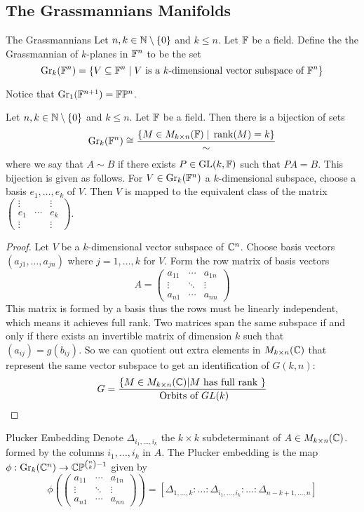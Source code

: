 \documentclass[a4paper]{article}
\begin{document}
\subsection{The Grassmannians Manifolds}
\begin{defn}{The Grassmannians}{} Let $n,k\in\mathbb{N}\setminus\{0\}$ and $k\leq n$. Let $\mathbb{F}$ be a field. Define the the Grassmannian of $k$-planes in $\mathbb{F}^n$ to be the set $$\operatorname{Gr}_k(\mathbb{F}^n)=\{V\subseteq\mathbb{F}^n\;|\;V\text{ is a }k\text{-dimensional vector subspace of }\mathbb{F}^n\}$$
\end{defn}

Notice that $\operatorname{Gr}_1(\mathbb{F}^{n+1})=\mathbb{F}\mathbb{P}^n$. 

\begin{lmm}{}{} Let $n,k\in\mathbb{N}\setminus\{0\}$ and $k\leq n$. Let $\mathbb{F}$ be a field. Then there is a bijection of sets $$\operatorname{Gr}_k(\mathbb{F}^n)\cong\frac{\{M\in M_{k\times n}(\mathbb{F})\;|\;\rank(M)=k\}}{\sim}$$ where we say that $A\sim B$ if there exists $P\in\operatorname{GL}(k,\mathbb{F})$ such that $PA=B$. This bijection is given as follows. For $V\in\operatorname{Gr}_k(\mathbb{F}^n)$ a $k$-dimensional subspace, choose a basis $e_1,\dots,e_k$ of $V$. Then $V$ is mapped to the equivalent class of the matrix $\begin{pmatrix}
\vdots &&\vdots\\
e_1 & \cdots & e_k\\
\vdots &&\vdots
\end{pmatrix}$. \tcbline
\begin{proof}
Let $V$ be a $k$-dimensional vector subspace of $\mathbb{C}^n$. Choose basis vectors $(a_{j1},\dots,a_{jn})$ where $j=1,\dots,k$ for $V$. Form the row matrix of basis vectors $$A=\begin{pmatrix}a_{11} & \cdots & a_{1n}\\\vdots & \ddots & \vdots\\ a_{n1} & \cdots & a_{nn}\end{pmatrix}$$
This matrix is formed by a basis thus the rows must be linearly independent, which means it achieves full rank. Two matrices span the same subspace if and only if there exists an invertible matrix of dimension $k$ such that $(a_{ij})=g(b_{ij})$. So we can quotient out extra elements in $M_{k\times n}(\mathbb{C})$ that represent the same vector subspace to get an identification of $G(k,n)$: $$G=\frac{\{M\in M_{k\times n}(\mathbb{C})|M\text{ has full rank }\}}{\text{ Orbits of }GL(k)}$$ 
\end{proof}
\end{lmm}

\begin{defn}{Plucker Embedding}{} Denote $\Delta_{i_1,\dots,i_k}$ the $k\times k$ subdeterminant of $A\in M_{k\times n}(\mathbb{C})$. formed by the columns $i_1,\dots,i_k$ in $A$. The Plucker embedding is the map $\phi:\operatorname{Gr}_k(\mathbb{C}^n)\to\mathbb{C}\mathbb{P}^{\binom{n}{k}-1}$ given by $$\phi\left(\begin{pmatrix}a_{11} & \cdots & a_{1n}\\\vdots & \ddots & \vdots\\ a_{n1} & \cdots & a_{nn}\end{pmatrix}\right)=[\Delta_{1,\dots,k}:\dots:\Delta_{i_1,\dots,i_k}:\dots:\Delta_{n-k+1,\dots,n}]$$ 
\end{defn}
\end{document}
